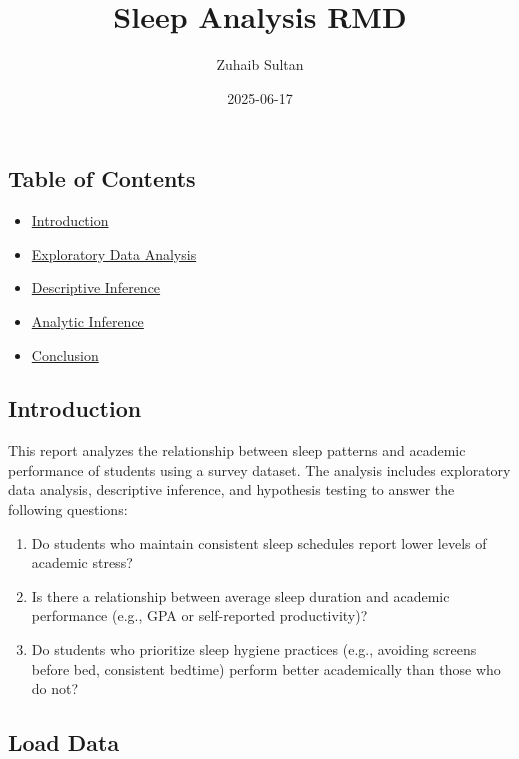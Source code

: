 \documentclass[
]{article}
\title{Sleep Analysis RMD}
\author{Zuhaib Sultan}
\date{2025-06-17}
\providecommand{\tightlist}{%
  \setlength{\itemsep}{0pt}\setlength{\parskip}{0pt}}
\begin{document}
\maketitle

\subsection{Table of Contents}\label{table-of-contents}

\begin{itemize}
\tightlist
\item
  \hyperref[introduction]{Introduction}
\item
  \hyperref[exploratory-data-analysis]{Exploratory Data Analysis}
\item
  \hyperref[descriptive-inference]{Descriptive Inference}
\item
  \hyperref[analytic-inference]{Analytic Inference}
\item
  \hyperref[conclusion]{Conclusion}
\end{itemize}

\subsection{Introduction}\label{introduction}

This report analyzes the relationship between sleep patterns and
academic performance of students using a survey dataset. The analysis
includes exploratory data analysis, descriptive inference, and
hypothesis testing to answer the following questions:

\begin{enumerate}
\def\labelenumi{\arabic{enumi}.}
\tightlist
\item
  Do students who maintain consistent sleep schedules report lower
  levels of academic stress?
\item
  Is there a relationship between average sleep duration and academic
  performance (e.g., GPA or self-reported productivity)?
\item
  Do students who prioritize sleep hygiene practices (e.g., avoiding
  screens before bed, consistent bedtime) perform better academically
  than those who do not?
\end{enumerate}

\subsection{Load Data}\label{load-data}
\end{document}
